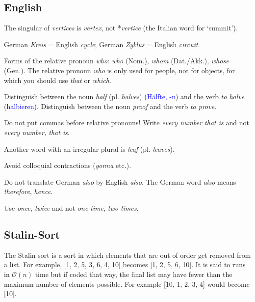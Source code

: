 \documentclass[a4paper]{article}
\begin{document}
\subsection{English}

The singular of \emph{vertices} is \emph{vertex}, not *\emph{vertice} (the Italian word for `summit').

German \emph{Kreis} = English \emph{cycle}; German \emph{Zyklus} = English \emph{circuit}.

Forms of the relative pronoun \emph{who}: \emph{who} (Nom.), \emph{whom} (Dat./Akk.), \emph{whose} (Gen.). The relative pronoun \emph{who} is only used for people, not for objects, for which you should use \emph{that} or \emph{which}.

Distinguish between the noun \emph{half} (pl. \emph{halves}) (\textcolor{blue}{Hälfte, -n}) and the verb \emph{to halve} (\textcolor{blue}{halbieren}). Distinguish between the noun \emph{proof} and the verb \emph{to prove}.

Do not put commas before relative pronouns! Write \emph{every number that is} and not \emph{every number, that is}.

Another word with an irregular plural is \emph{leaf} (pl. \emph{leaves}).

Avoid colloquial contractions (\emph{gonna} etc.).

Do not translate German \emph{also} by English \emph{also}. The German word \emph{also} means \emph{therefore}, \emph{hence}.

Use \emph{once}, \emph{twice} and not \emph{one time}, \emph{two times}.

\subsection{Stalin-Sort}
The Stalin sort is a sort in which elements that are out of order get removed from a list. For example, [1, 2, 5, 3, 6, 4, 10] becomes [1, 2, 5, 6, 10]. It is said to runs in $\mathcal{O}(n)$ time but if coded that way, the final list may have fewer than the maximum number of elements possible. For example [10, 1, 2, 3, 4] would become [10].
\end{document}
